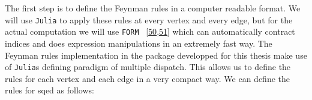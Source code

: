 \documentclass[
  10pt,
  a4paper,
  DIV=11,
  numbers=noendperiod,
  oneside]{scrreprt}
\newenvironment{Shaded}{\begin{snugshade}}{\end{snugshade}}
\newcommand{\DataTypeTok}[1]{\textcolor[rgb]{0.68,0.00,0.00}{#1}}
\newcommand{\FunctionTok}[1]{\textcolor[rgb]{0.28,0.35,0.67}{#1}}
\newcommand{\KeywordTok}[1]{\textcolor[rgb]{0.00,0.23,0.31}{#1}}
\newcommand{\NormalTok}[1]{\textcolor[rgb]{0.00,0.23,0.31}{#1}}
\newcommand{\OperatorTok}[1]{\textcolor[rgb]{0.37,0.37,0.37}{#1}}
\newcommand{\PreprocessorTok}[1]{\textcolor[rgb]{0.68,0.00,0.00}{#1}}
\newcommand{\SpecialCharTok}[1]{\textcolor[rgb]{0.37,0.37,0.37}{#1}}
\newcommand{\StringTok}[1]{\textcolor[rgb]{0.13,0.47,0.30}{#1}}
\DeclareRobustCommand{\[}{\begin{equation}}
\DeclareRobustCommand{\]}{\end{equation}}
\begin{document}
The first step is to define the Feynman rules in a computer readable
format. We will use \texttt{Julia} to apply these rules at every vertex
and every edge, but for the actual computation we will use \texttt{FORM}
~{[}\protect\hyperlink{ref-Vermaseren:2000nd}{50},\protect\hyperlink{ref-Kuipers:2012rf}{51}{]}
which can automatically contract indices and does expression
manipulations in an extremely fast way. The Feynman rules implementation
in the package developped for this thesis make use of \texttt{Julia}s
defining paradigm of multiple dispatch. This allows us to define the
rules for each vertex and each edge in a very compact way. We can define
the rules for \gls{sqed} as follows:

\begin{Shaded}
\end{Shaded}
\end{document}
